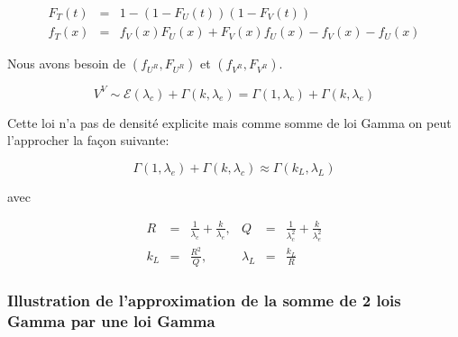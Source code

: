 \documentclass[
  letterpaper,
  DIV=11,
  numbers=noendperiod]{scrartcl}
\begin{document}
\[
\begin{array}{ccl}
F_{T}(t) &=& 1 - (1-F_{U}(t))(1-F_{V}(t))\\
f_{T}(x)  &=& f_{V}(x) F_{U}(x) + F_{V}(x) f_{U}(x) - f_{V}(x)  - f_{U}(x)
\end{array}
\]

Nous avons besoin de \((f_{U^R}, F_{U^R})\) et \((f_{V^R}, F_{V^R})\).

\[V^V \sim \mathcal{E}(\lambda_c)+ \Gamma(k,\lambda_e) = \Gamma(1,\lambda_c)+ \Gamma(k,\lambda_e)\]

Cette loi n'a pas de densité explicite mais comme somme de loi Gamma on
peut l'approcher la façon suivante:

\[ \Gamma(1,\lambda_e)+ \Gamma(k,\lambda_c) \approx \Gamma(k_L,\lambda_L)\]

avec

\[
\begin{array}{cclccl}
R &=& \frac{1}{\lambda_c} + \frac{k}{\lambda_e}, & 
Q &=& \frac{1}{\lambda_c^2} + \frac{k}{\lambda_e^2}\\
k_L &=& \frac{R^2}{Q},& \lambda_L &=&\frac{k_L}{R}
\end{array}
\]

\hypertarget{illustration-de-lapproximation-de-la-somme-de-2-lois-gamma-par-une-loi-gamma}{%
\subsubsection{Illustration de l'approximation de la somme de 2 lois
Gamma par une loi
Gamma}\label{illustration-de-lapproximation-de-la-somme-de-2-lois-gamma-par-une-loi-gamma}}
\end{document}
